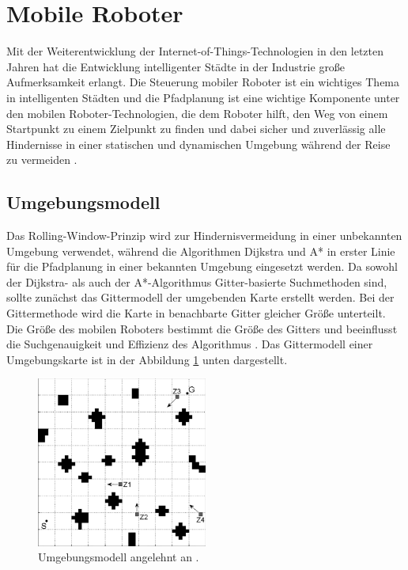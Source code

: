 \newpage
\section{Mobile Roboter}
\label{Mobile Roboter}
Mit der Weiterentwicklung der Internet-of-Things-Technologien in den letzten Jahren hat die Entwicklung intelligenter Städte in der Industrie große Aufmerksamkeit erlangt.
Die Steuerung mobiler Roboter ist ein wichtiges Thema in intelligenten Städten und die Pfadplanung ist eine wichtige Komponente unter den mobilen Roboter-Technologien, die dem Roboter hilft, den Weg von einem Startpunkt zu einem Zielpunkt zu finden und dabei sicher und zuverlässig alle Hindernisse in einer statischen und dynamischen Umgebung während der Reise zu vermeiden \cite{Myung21,Hong-mei17}.

\subsection{Umgebungsmodell}
Das Rolling-Window-Prinzip wird zur Hindernisvermeidung in einer unbekannten Umgebung verwendet, während die Algorithmen Dijkstra und A* in erster Linie für die Pfadplanung in einer bekannten Umgebung eingesetzt werden.
\newline
Da sowohl der Dijkstra- als auch der A*-Algorithmus Gitter-basierte Suchmethoden sind, sollte zunächst das Gittermodell der umgebenden Karte erstellt werden. Bei der Gittermethode wird die Karte in benachbarte Gitter gleicher Größe unterteilt. 
Die Größe des mobilen Roboters bestimmt die Größe des Gitters und beeinflusst die Suchgenauigkeit und Effizienz des Algorithmus \cite{Hong-mei17}.
\newline
Das Gittermodell einer Umgebungskarte ist in der Abbildung \ref{fig:Umgebungsmodell-Grid} unten dargestellt.

\begin{figure}[H]
	\centering
	\includegraphics[width=0.5\textwidth]{images/Grid_Modell.PNG}
	\caption{Umgebungsmodell angelehnt an \cite{Hong-mei17}.}
	\label{fig:Umgebungsmodell-Grid}
\end{figure}

